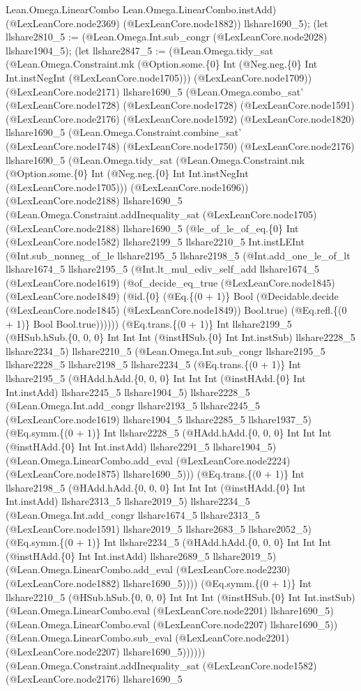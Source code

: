 \documentclass[11pt]{article}
\begin{document}
Lean.Omega.LinearCombo Lean.Omega.LinearCombo.instAdd) (@LexLeanCore.node2369) (@LexLeanCore.node1882)) llshare1690\_5); (let llshare2810\_5 := (@Lean.Omega.Int.sub\_congr (@LexLeanCore.node2028) llshare1904\_5); (let llshare2847\_5 := (@Lean.Omega.tidy\_sat (@Lean.Omega.Constraint.mk (@Option.some.\{0\} Int (@Neg.neg.\{0\} Int Int.instNegInt (@LexLeanCore.node1705))) (@LexLeanCore.node1709)) (@LexLeanCore.node2171) llshare1690\_5 (@Lean.Omega.combo\_sat' (@LexLeanCore.node1728) (@LexLeanCore.node1728) (@LexLeanCore.node1591) (@LexLeanCore.node2176) (@LexLeanCore.node1592) (@LexLeanCore.node1820) llshare1690\_5 (@Lean.Omega.Constraint.combine\_sat' (@LexLeanCore.node1748) (@LexLeanCore.node1750) (@LexLeanCore.node2176) llshare1690\_5 (@Lean.Omega.tidy\_sat (@Lean.Omega.Constraint.mk (@Option.some.\{0\} Int (@Neg.neg.\{0\} Int Int.instNegInt (@LexLeanCore.node1705))) (@LexLeanCore.node1696)) (@LexLeanCore.node2188) llshare1690\_5 (@Lean.Omega.Constraint.addInequality\_sat (@LexLeanCore.node1705) (@LexLeanCore.node2188) llshare1690\_5 (@le\_of\_le\_of\_eq.\{0\} Int (@LexLeanCore.node1582) llshare2199\_5 llshare2210\_5 Int.instLEInt (@Int.sub\_nonneg\_of\_le llshare2195\_5 llshare2198\_5 (@Int.add\_one\_le\_of\_lt llshare1674\_5 llshare2195\_5 (@Int.lt\_mul\_ediv\_self\_add llshare1674\_5 (@LexLeanCore.node1619) (@of\_decide\_eq\_true (@LexLeanCore.node1845) (@LexLeanCore.node1849) (@id.\{0\} (@Eq.\{(0 + 1)\} Bool (@Decidable.decide (@LexLeanCore.node1845) (@LexLeanCore.node1849)) Bool.true) (@Eq.refl.\{(0 + 1)\} Bool Bool.true)))))) (@Eq.trans.\{(0 + 1)\} Int llshare2199\_5 (@HSub.hSub.\{0, 0, 0\} Int Int Int (@instHSub.\{0\} Int Int.instSub) llshare2228\_5 llshare2234\_5) llshare2210\_5 (@Lean.Omega.Int.sub\_congr llshare2195\_5 llshare2228\_5 llshare2198\_5 llshare2234\_5 (@Eq.trans.\{(0 + 1)\} Int llshare2195\_5 (@HAdd.hAdd.\{0, 0, 0\} Int Int Int (@instHAdd.\{0\} Int Int.instAdd) llshare2245\_5 llshare1904\_5) llshare2228\_5 (@Lean.Omega.Int.add\_congr llshare2193\_5 llshare2245\_5 (@LexLeanCore.node1619) llshare1904\_5 llshare2285\_5 llshare1937\_5) (@Eq.symm.\{(0 + 1)\} Int llshare2228\_5 (@HAdd.hAdd.\{0, 0, 0\} Int Int Int (@instHAdd.\{0\} Int Int.instAdd) llshare2291\_5 llshare1904\_5) (@Lean.Omega.LinearCombo.add\_eval (@LexLeanCore.node2224) (@LexLeanCore.node1875) llshare1690\_5))) (@Eq.trans.\{(0 + 1)\} Int llshare2198\_5 (@HAdd.hAdd.\{0, 0, 0\} Int Int Int (@instHAdd.\{0\} Int Int.instAdd) llshare2313\_5 llshare2019\_5) llshare2234\_5 (@Lean.Omega.Int.add\_congr llshare1674\_5 llshare2313\_5 (@LexLeanCore.node1591) llshare2019\_5 llshare2683\_5 llshare2052\_5) (@Eq.symm.\{(0 + 1)\} Int llshare2234\_5 (@HAdd.hAdd.\{0, 0, 0\} Int Int Int (@instHAdd.\{0\} Int Int.instAdd) llshare2689\_5 llshare2019\_5) (@Lean.Omega.LinearCombo.add\_eval (@LexLeanCore.node2230) (@LexLeanCore.node1882) llshare1690\_5)))) (@Eq.symm.\{(0 + 1)\} Int llshare2210\_5 (@HSub.hSub.\{0, 0, 0\} Int Int Int (@instHSub.\{0\} Int Int.instSub) (@Lean.Omega.LinearCombo.eval (@LexLeanCore.node2201) llshare1690\_5) (@Lean.Omega.LinearCombo.eval (@LexLeanCore.node2207) llshare1690\_5)) (@Lean.Omega.LinearCombo.sub\_eval (@LexLeanCore.node2201) (@LexLeanCore.node2207) llshare1690\_5)))))) (@Lean.Omega.Constraint.addInequality\_sat (@LexLeanCore.node1582) (@LexLeanCore.node2176) llshare1690\_5 
\end{document}
